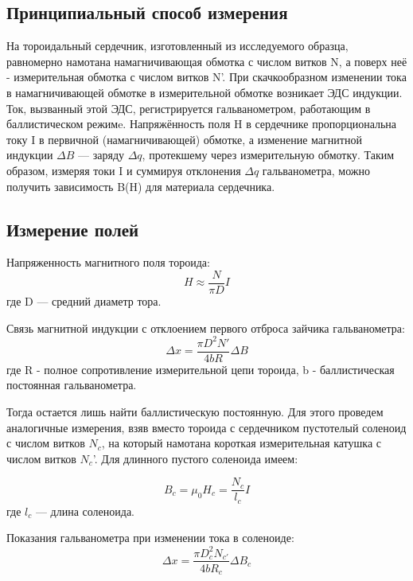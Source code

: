 \documentclass[a4paper, 12pt]{article}
\begin{document}
\subsection{Принципиальный способ измерения}
\hspace{0.6cm} На тороидальный сердечник, изготовленный из исследуемого образца, равномерно намотана намагничивающая обмотка с числом витков N, а поверх неё - измерительная обмотка с числом витков N'. При скачкообразном изменении тока в намагничивающей обмотке в измерительной обмотке возникает ЭДС индукции. Ток, вызванный этой ЭДС, регистрируется гальванометром, работающим в баллистическом режимe.
Напряжённость поля H в сердечнике пропорциональна току I в
первичной (намагничивающей) обмотке, а изменение магнитной индукции $\Delta B$ — заряду $\Delta q$, протекшему через измерительную обмотку. Таким образом, измеряя токи I и суммируя отклонения $\Delta q$ гальванометра, можно получить зависимость B(H) для материала сердечника.

\subsection{Измерение полей}
Напряженность магнитного поля тороида:
\begin{equation}
    H \approx \frac{N}{\pi D} I
\end{equation}
где D — средний диаметр тора.

Связь магнитной индукции с отклоением первого отброса зайчика гальванометра:
\begin{equation}
    \Delta x = \frac{\pi D^2 N'}{4bR} \Delta B
\end{equation} 
где R - полное сопротивление измерительной цепи тороида, b - баллистическая постоянная гальванометра.

Тогда остается лишь найти баллистическую постоянную.
Для этого проведем аналогичные измерения, взяв вместо тороида с сердечником пустотелый соленоид с числом витков $N_{c}$, на который намотана короткая измерительная катушка с числом витков $N_{c}$'. Для длинного пустого соленоида
имеем:

\begin{equation}
    B_{c} = \mu_0 H_{c} = \frac{N_{c}}{l_{c}} I
\end{equation}
где $l_{c}$ — длина соленоида.

Показания гальванометра при изменении тока в соленоиде:
\begin{equation}
    \Delta x = \frac{\pi D_{c}^2 N_{c'}}{4bR_{c}} \Delta B_{c}
\end{equation}
\end{document}
